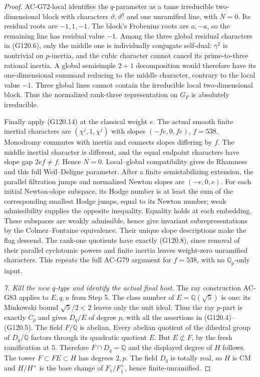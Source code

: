 \begin{proof}
AC-G72-local identifies the $q$-parameter as a tame irreducible
two-dimensional block with characters $\vartheta,\vartheta^q$
and one unramified line, with $N=0$.
Its residual roots are $-1,1,-1$.  The block's Frobenius roots
are $a,-a$, so the remaining line has residual value $-1$.
Among the three global residual characters in (G120.6), only
the middle one is individually conjugate self-dual:
$\bar\gamma^2$ is nontrivial on $p$-inertia, and the cubic
character cannot cancel its prime-to-three rational inertia.
A global semisimple $2+1$ decomposition would therefore have
its one-dimensional summand reducing to the middle character,
contrary to the local value $-1$.  Three global lines cannot
contain the irreducible local two-dimensional block.
Thus the normalized rank-three representation on $G_F$ is
absolutely irreducible.

Finally apply (G120.14) at the classical weight $e$.
The actual smooth finite inertial characters are
$(\chi^j,1,\chi^j)$ with slopes $(-fe,0,fe)$, $f=538$.
Monodromy commutes with inertia and connects slopes differing
by $f$.  The middle inertial character is different, and the
equal endpoint characters have slope gap $2ef\ne f$.
Hence $N=0$.  Local--global compatibility gives de Rhamness
and this full Weil--Deligne parameter.
After a finite semistabilizing extension, the parallel
filtration jumps and normalized Newton slopes are $(-e,0,e)$.
For each initial Newton-slope subspace, its Hodge number is
at least the sum of the corresponding smallest Hodge jumps,
equal to its Newton number; weak admissibility supplies the
opposite inequality.  Equality holds at each embedding.
These subspaces are weakly admissible, hence give invariant
subrepresentations by the Colmez--Fontaine equivalence.
Their unique slope descriptions make the flag descend.
The rank-one quotients have exactly (G120.8), since removal
of their parallel cyclotomic powers and finite inertia leaves
weight-zero unramified characters.  This repeats the full
AC-G79 argument for $f=538$, with no $\mathbb Q_p$-only input.

\emph{7. Kill the new $q$-type and identify the actual final host.}
The ray construction AC-G83 applies to $E,q,u$ from Step 5.
The class number of $E=\mathbb Q(\sqrt5)$ is one: its
Minkowski bound $\sqrt5/2<2$ leaves only the unit ideal.
Thus the ray $p$-part is exactly $C_p$ and gives $D_q/E$
of degree $p$, with all the assertions in (G120.4)--(G120.5).
The field $F/\mathbb Q$ is abelian.  Every abelian quotient
of the dihedral group of $D_q/\mathbb Q$ factors through
its quadratic quotient $E$.  But $E\not\subset F$, by the
fresh ramification at $5$.  Therefore $F\cap D_q=\mathbb Q$
and the displayed degree of $H$ follows.
The tower $F\subset FE\subset H$ has degrees $2,p$.
The field $D_q$ is totally real, so $H$ is CM and $H/H^+$
is the base change of $F_1/F_1^+$, hence finite-unramified.


\end{proof}
